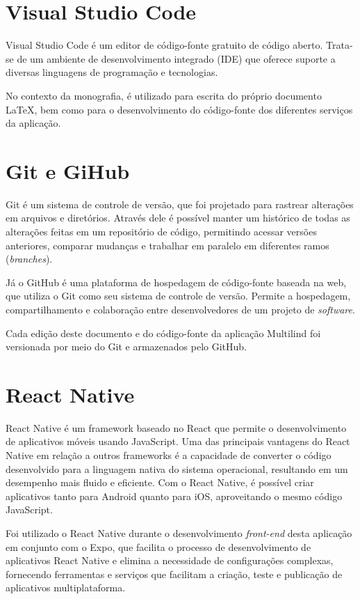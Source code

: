 \section{Visual Studio Code}
\label{sec:Visual Studio Code}
Visual Studio Code é um editor de código-fonte gratuito de código aberto. Trata-se de um ambiente de desenvolvimento 
integrado (IDE) que oferece suporte a diversas linguagens de programação e tecnologias.

No contexto da monografia, é utilizado para escrita do próprio documento LaTeX, bem como para o desenvolvimento do código-fonte 
dos diferentes serviços da aplicação.

\section{Git e GiHub}
\label{sec:Git e GiHub}
Git é um sistema de controle de versão, que foi projetado para rastrear alterações em arquivos e diretórios. Através dele é 
possível manter um histórico de todas as alterações feitas em um repositório de código, permitindo acessar versões anteriores, 
comparar mudanças e trabalhar em paralelo em diferentes ramos (\textit{branches}).

Já o GitHub é uma plataforma de hospedagem de código-fonte baseada na web, que utiliza o Git como seu sistema de controle de 
versão. Permite a hospedagem, compartilhamento e colaboração entre desenvolvedores de um projeto de \textit{software}.

Cada edição deste documento e do código-fonte da aplicação Multilind foi versionada por meio do Git e armazenados pelo GitHub. 

\section{React Native}
\label{sec:React Native}
React Native é um framework baseado no React que permite o desenvolvimento de aplicativos móveis usando JavaScript. Uma das 
principais vantagens do React Native em relação a outros frameworks é a capacidade de converter o código desenvolvido para a 
linguagem nativa do sistema operacional, resultando em um desempenho mais fluido e eficiente. Com o React Native, é possível 
criar aplicativos tanto para Android quanto para iOS, aproveitando o mesmo código JavaScript.

Foi utilizado o React Native durante o desenvolvimento \textit{front-end} desta aplicação em conjunto com o Expo, que facilita 
o processo de desenvolvimento de aplicativos React Native e elimina a necessidade de configurações complexas, fornecendo ferramentas 
e serviços que facilitam a criação, teste e publicação de aplicativos multiplataforma.

